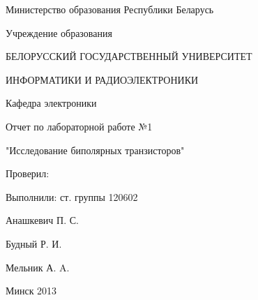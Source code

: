 \thispagestyle{empty}

\begin{center}
Министерство образования Республики Беларусь\par
\vspace{2mm}
Учреждение образования\par
БЕЛОРУССКИЙ ГОСУДАРСТВЕННЫЙ УНИВЕРСИТЕТ\par
ИНФОРМАТИКИ И РАДИОЭЛЕКТРОНИКИ\par 
\vspace{2mm}
Кафедра электроники\par

\end{center}

\vspace{50mm}

\begin{center}
Отчет по лабораторной работе №1\par
"Исследование биполярных транзисторов"\par
\end{center}

\vspace{40mm}

\begin{multicols}{2}
Проверил:
\vspace{40mm}

\begin{flushright}

Выполнили: ст. группы 120602

Анашкевич П. С.

Будный Р. И.

Мельник А. A.

\end{flushright}
\end{multicols}

\vspace{50mm}
\begin{center}
{Минск 2013}
\end{center}

\newpage
